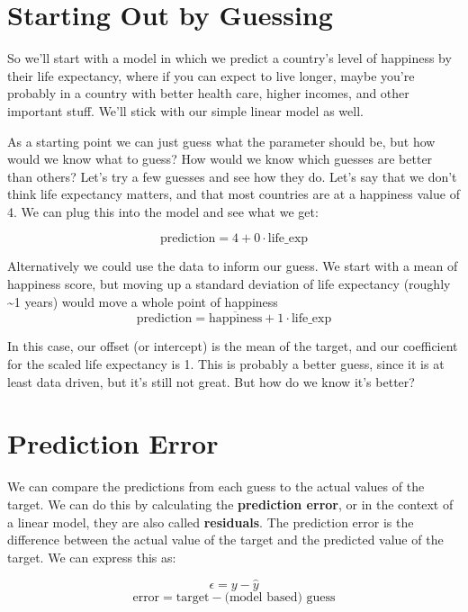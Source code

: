\documentclass[
  letterpaper,
]{krantz}
\begin{document}
\section{Starting Out by Guessing}\label{starting-out-by-guessing}

So we'll start with a model in which we predict a country's level of
happiness by their life expectancy, where if you can expect to live
longer, maybe you're probably in a country with better health care,
higher incomes, and other important stuff. We'll stick with our simple
linear model as well.

As a starting point we can just guess what the parameter should be, but
how would we know what to guess? How would we know which guesses are
better than others? Let's try a few guesses and see how they do. Let's
say that we don't think life expectancy matters, and that most countries
are at a happiness value of 4. We can plug this into the model and see
what we get:

\[
\textrm{prediction} = 4 + 0\cdot\textrm{life\_exp}
\]

Alternatively we could use the data to inform our guess. We start with a
mean of happiness score, but moving up a standard deviation of life
expectancy (roughly \textasciitilde1 years) would move a whole point of
happiness \[
\textrm{prediction} = \overline{\textrm{happiness}} + 1\cdot\textrm{life\_exp}
\]

In this case, our offset (or intercept) is the mean of the target, and
our coefficient for the scaled life expectancy is 1. This is probably a
better guess, since it is at least data driven, but it's still not
great. But how do we know it's better?

\section{Prediction Error}\label{prediction-error-1}

We can compare the predictions from each guess to the actual values of
the target. We can do this by calculating the \textbf{prediction error},
or in the context of a linear model, they are also called
\textbf{residuals}. The prediction error is the difference between the
actual value of the target and the predicted value of the target. We can
express this as:

\[
\epsilon = y - \hat{y}
\] \[ 
\textrm{error} = \textrm{target} - \textrm{(model based) guess}
\]
\end{document}
